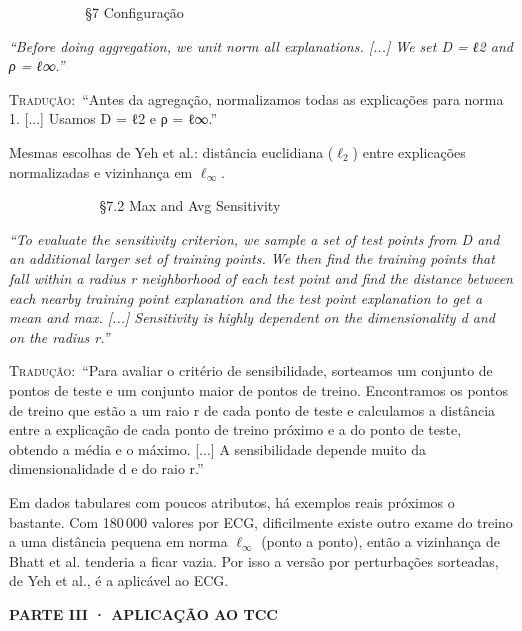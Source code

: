 \documentclass[11pt,a4paper]{article}
\newcommand{\pagechip}[1]{{\setlength{\fboxsep}{1.5pt}\colorbox{cAcc}{\textcolor{white}{\scriptsize\texttt{#1}}}}}
\newcommand{\partbar}[1]{\par\vspace{1.2em}\noindent\colorbox{black!80}{\parbox{\dimexpr\linewidth-2\fboxsep}{\color{white}\bfseries\sffamily\MakeUppercase{#1}}}\par\vspace{0.4em}}
\newenvironment{origquote}{\par\itshape\small}{\par}
\newenvironment{tradquote}{\par\small\textsc{Tradução:}\ }{\par}
\newcommand{\explab}[1]{\par\smallskip{\small\color{cAcc}\textbf{\MakeUppercase{#1}}}\par}
\begin{document}
\begin{citacard}{\pagechip{Bhatt p. 5} §7 Configuração}
\begin{origquote}“Before doing aggregation, we unit norm all explanations. [...] We set D = ℓ2 and ρ = ℓ∞.”\end{origquote}
\begin{tradquote}“Antes da agregação, normalizamos todas as explicações para norma 1. [...] Usamos D = ℓ2 e ρ = ℓ∞.”\end{tradquote}
\explab{Explicação}
Mesmas escolhas de Yeh et al.: distância euclidiana ($\ell_2$) entre explicações normalizadas e vizinhança em $\ell_\infty$.
\end{citacard}

\begin{citacard}{\pagechip{Bhatt p. 5--6} §7.2 Max and Avg Sensitivity}
\begin{origquote}“To evaluate the sensitivity criterion, we sample a set of test points from D and an additional larger set of training points. We then find the training points that fall within a radius r neighborhood of each test point and find the distance between each nearby training point explanation and the test point explanation to get a mean and max. [...] Sensitivity is highly dependent on the dimensionality d and on the radius r.”\end{origquote}
\begin{tradquote}“Para avaliar o critério de sensibilidade, sorteamos um conjunto de pontos de teste e um conjunto maior de pontos de treino. Encontramos os pontos de treino que estão a um raio r de cada ponto de teste e calculamos a distância entre a explicação de cada ponto de treino próximo e a do ponto de teste, obtendo a média e o máximo. [...] A sensibilidade depende muito da dimensionalidade d e do raio r.”\end{tradquote}
\explab{Explicação}
Em dados tabulares com poucos atributos, há exemplos reais próximos o bastante. Com 180\,000 valores por ECG, dificilmente existe outro exame do treino a uma distância pequena em norma $\ell_\infty$ (ponto a ponto), então a vizinhança de Bhatt et al. tenderia a ficar vazia. Por isso a versão por perturbações sorteadas, de Yeh et al., é a aplicável ao ECG.
\end{citacard}

\partbar{Parte III · Aplicação ao TCC}
\end{document}
